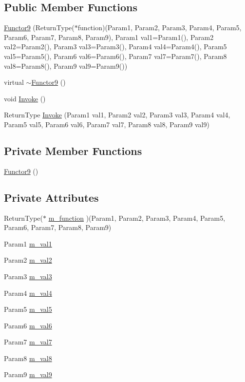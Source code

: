 \subsection*{Public Member Functions}
\begin{CompactItemize}
\item 
\hyperlink{classDL_1_1Functor9_a0}{Functor9} (Return\-Type($\ast$function)(Param1, Param2, Param3, Param4, Param5, Param6, Param7, Param8, Param9), Param1 val1=Param1(), Param2 val2=Param2(), Param3 val3=Param3(), Param4 val4=Param4(), Param5 val5=Param5(), Param6 val6=Param6(), Param7 val7=Param7(), Param8 val8=Param8(), Param9 val9=Param9())
\item 
virtual \hyperlink{classDL_1_1Functor9_a1}{$\sim$Functor9} ()
\item 
void \hyperlink{classDL_1_1Functor9_a2}{Invoke} ()
\item 
Return\-Type \hyperlink{classDL_1_1Functor9_a3}{Invoke} (Param1 val1, Param2 val2, Param3 val3, Param4 val4, Param5 val5, Param6 val6, Param7 val7, Param8 val8, Param9 val9)
\end{CompactItemize}
\subsection*{Private Member Functions}
\begin{CompactItemize}
\item 
\hyperlink{classDL_1_1Functor9_d0}{Functor9} ()
\end{CompactItemize}
\subsection*{Private Attributes}
\begin{CompactItemize}
\item 
Return\-Type($\ast$ \hyperlink{classDL_1_1Functor9_r0}{m\_\-function} )(Param1, Param2, Param3, Param4, Param5, Param6, Param7, Param8, Param9)
\item 
Param1 \hyperlink{classDL_1_1Functor9_r1}{m\_\-val1}
\item 
Param2 \hyperlink{classDL_1_1Functor9_r2}{m\_\-val2}
\item 
Param3 \hyperlink{classDL_1_1Functor9_r3}{m\_\-val3}
\item 
Param4 \hyperlink{classDL_1_1Functor9_r4}{m\_\-val4}
\item 
Param5 \hyperlink{classDL_1_1Functor9_r5}{m\_\-val5}
\item 
Param6 \hyperlink{classDL_1_1Functor9_r6}{m\_\-val6}
\item 
Param7 \hyperlink{classDL_1_1Functor9_r7}{m\_\-val7}
\item 
Param8 \hyperlink{classDL_1_1Functor9_r8}{m\_\-val8}
\item 
Param9 \hyperlink{classDL_1_1Functor9_r9}{m\_\-val9}
\end{CompactItemize}


